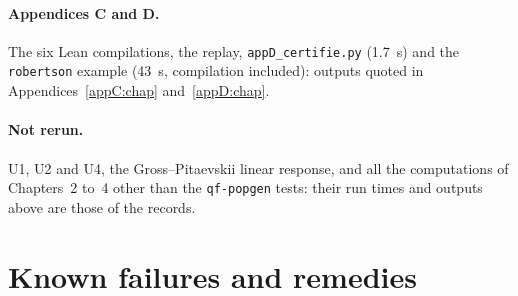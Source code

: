 \paragraph{Appendices C and D.} The six Lean compilations, the  replay, \texttt{appD\_certifie.py}
(1.7~s) and the \texttt{robertson} example (43~s, compilation included): outputs quoted in Appendices~\ref{appC:chap}
and~\ref{appD:chap}.

\paragraph{Not rerun.} U1, U2 and U4, the Gross--Pitaevskii linear response, and all the computations of Chapters~2
to~4 other than the \texttt{qf-popgen} tests: their run times and outputs above are those of the records.

\section{Known failures and remedies}\label{appE:sec:pannes}

